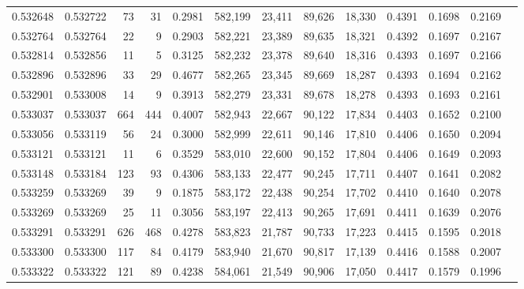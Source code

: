 \begin{tabular}{rrrrrrrrrrrrr}
0.532648 & 0.532722 &    73 &    31 &                                     0.2981 & 582,199 &  23,411 &  89,626 &  18,330 & 0.4391 & 0.1698 & 0.2169 \\
0.532764 & 0.532764 &    22 &     9 &                                     0.2903 & 582,221 &  23,389 &  89,635 &  18,321 & 0.4392 & 0.1697 & 0.2167 \\
0.532814 & 0.532856 &    11 &     5 &                                     0.3125 & 582,232 &  23,378 &  89,640 &  18,316 & 0.4393 & 0.1697 & 0.2166 \\
0.532896 & 0.532896 &    33 &    29 &                                     0.4677 & 582,265 &  23,345 &  89,669 &  18,287 & 0.4393 & 0.1694 & 0.2162 \\
0.532901 & 0.533008 &    14 &     9 &                                     0.3913 & 582,279 &  23,331 &  89,678 &  18,278 & 0.4393 & 0.1693 & 0.2161 \\
0.533037 & 0.533037 &   664 &   444 &                                     0.4007 & 582,943 &  22,667 &  90,122 &  17,834 & 0.4403 & 0.1652 & 0.2100 \\
0.533056 & 0.533119 &    56 &    24 &                                     0.3000 & 582,999 &  22,611 &  90,146 &  17,810 & 0.4406 & 0.1650 & 0.2094 \\
0.533121 & 0.533121 &    11 &     6 &                                     0.3529 & 583,010 &  22,600 &  90,152 &  17,804 & 0.4406 & 0.1649 & 0.2093 \\
0.533148 & 0.533184 &   123 &    93 &                                     0.4306 & 583,133 &  22,477 &  90,245 &  17,711 & 0.4407 & 0.1641 & 0.2082 \\
0.533259 & 0.533269 &    39 &     9 &                                     0.1875 & 583,172 &  22,438 &  90,254 &  17,702 & 0.4410 & 0.1640 & 0.2078 \\
0.533269 & 0.533269 &    25 &    11 &                                     0.3056 & 583,197 &  22,413 &  90,265 &  17,691 & 0.4411 & 0.1639 & 0.2076 \\
0.533291 & 0.533291 &   626 &   468 &                                     0.4278 & 583,823 &  21,787 &  90,733 &  17,223 & 0.4415 & 0.1595 & 0.2018 \\
0.533300 & 0.533300 &   117 &    84 &                                     0.4179 & 583,940 &  21,670 &  90,817 &  17,139 & 0.4416 & 0.1588 & 0.2007 \\
0.533322 & 0.533322 &   121 &    89 &                                     0.4238 & 584,061 &  21,549 &  90,906 &  17,050 & 0.4417 & 0.1579 & 0.1996 \\

\end{tabular}
